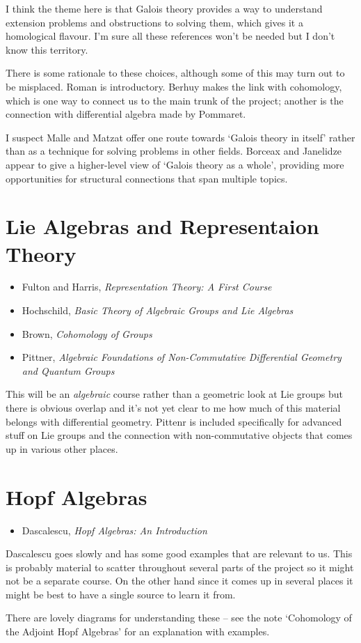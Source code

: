 \documentclass[article]{article}
\begin{document}
I think the theme here is that Galois theory provides a way to understand extension problems and obstructions to solving them, which gives it a homological flavour. I'm sure all these references won't be needed but I don't know this territory.

There is some rationale to these choices, although some of this may turn out to be misplaced. Roman is introductory. Berhuy makes the link with cohomology, which is one way to connect us to the main trunk of the project; another is the connection with differential algebra made by Pommaret. 

I suspect Malle and Matzat offer one route towards `Galois theory in itself' rather than as a technique for solving problems in other fields. Borceax and Janelidze appear to give a higher-level view of `Galois theory as a whole', providing more opportunities for structural connections that span multiple topics.

\section{Lie Algebras and Representaion Theory}

\begin{itemize}
	\item{Fulton and Harris, \textit{Representation Theory: A First Course}}
	\item{Hochschild, \textit{Basic Theory of Algebraic Groups and Lie Algebras}}
	\item{Brown, \textit{Cohomology of Groups}}
	\item{Pittner, \textit{Algebraic Foundations of Non-Commutative Differential Geometry and Quantum Groups}}
\end{itemize}

This will be an \textit{algebraic} course rather than a geometric look at Lie groups but there is obvious overlap and it's not yet clear to me how much of this material belongs with differential geometry. Pittenr is included specifically for advanced stuff on Lie groups and the connection with non-commutative objects that comes up in various other places.

\section{Hopf Algebras}

\begin{itemize}
	\item{Dascalescu, \textit{Hopf Algebras: An Introduction}}
\end{itemize}

Dascalescu goes slowly and has some good examples that are relevant to us. This is probably material to scatter throughout several parts of the project so it might not be a separate course. On the other hand since it comes up in several places it might be best to have a single source to learn it from.

There are lovely diagrams for understanding these -- see the note `Cohomology of the Adjoint Hopf Algebras' for an explanation with examples.
\end{document}
